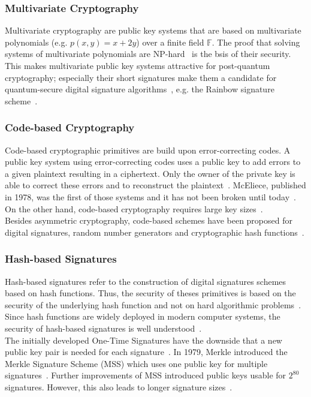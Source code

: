 \subsubsection{Multivariate Cryptography}
Multivariate cryptography are public key systems that are based on multivariate polynomials (e.g. $p(x,y)=x+2y$) over a finite field $\mathbb{F}$. The proof that solving systems of multivariate polynomials are NP-hard~\parencite{hartmanis1982computers} is the bsis of their security. This makes multivariate public key systems attractive for post-quantum cryptography; especially their short signatures make them a candidate for quantum-secure digital signature algorithms~\parencite{ding2017current}, e.g. the Rainbow signature scheme~\parencite{ding2005rainbow}.
\subsubsection{Code-based Cryptography}
Code-based cryptographic primitives are build upon error-correcting codes. A public key system using error-correcting codes uses a public key to add errors to a given plaintext resulting in a ciphertext. Only the owner of the private key is able to correct these errors and to reconstruct the plaintext~\parencite{bernstein2017post}. \gls{McEliece}, published in 1978, was the first of those systems and it has not been broken until today~\parencite{mceliece1978public}. On the other hand, code-based cryptography requires large key sizes~\parencite{bernstein2017post}.\\
Besides asymmetric cryptography, code-based schemes have been proposed for digital signatures, random number generators and cryptographic hash functions~\parencite{bernstein2017post}.
\subsubsection{Hash-based Signatures}
Hash-based signatures refer to the construction of digital signatures schemes based on hash functions. Thus, the security of theses primitives is based on the security of the underlying hash function and not on hard algorithmic problems~\parencite{bernstein2017post}. Since hash functions are widely deployed in modern computer systems, the security of hash-based signatures is well understood~\parencite{chen2016report}.\\
The initially developed One-Time Signatures have the downside that a new public key pair is needed for each signature~\parencite{becker2008merkle}. In 1979, Merkle introduced the Merkle Signature Scheme (\gls{MSS}) which uses one public key for multiple signatures~\parencite{merkle1979secrecy}. Further improvements of \gls{MSS} introduced public keys usable for $2^{80}$ signatures. However, this also leads to longer signature sizes~\parencite{becker2008merkle}.

